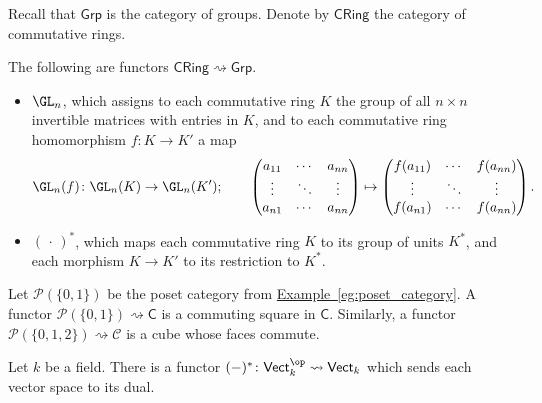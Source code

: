 \documentclass[notes.tex]{subfiles}
\begin{document}
\begin{example}
  \label{eg:twofunctorsgrptocring}
  Recall that $\mathsf{Grp}$ is the category of groups. Denote by $\mathsf{CRing}$ the category of commutative rings.

  The following are functors $\mathsf{CRing} \rightsquigarrow \mathsf{Grp}$.
  \begin{itemize}
    \item $\GL_{n}$, which assigns to each commutative ring $K$ the group of all $n \times n$ invertible matrices with entries in $K$, and to each commutative ring homomorphism $f\colon K \to K'$ a map
      \begin{equation*}
        \GL_{n}(f)\colon \GL_{n}(K) \to \GL_{n}(K');\qquad
        \begin{pmatrix}
          a_{11} & \cdots & a_{nn} \\
          \vdots & \ddots & \vdots \\
          a_{n1} & \cdots & a_{nn}
        \end{pmatrix}
        \mapsto
        \begin{pmatrix}
          f(a_{11}) & \cdots & f(a_{nn}) \\
          \vdots & \ddots & \vdots \\
          f(a_{n1}) & \cdots & f(a_{nn})
        \end{pmatrix}.
      \end{equation*}

    \item ${(\,\cdot\,)}^{*}$, which maps each commutative ring $K$ to its group of units $K^{*}$, and each morphism $K \to K'$ to its restriction to $K^{*}$.
  \end{itemize}
\end{example}

\begin{example}
  Let $\mathcal{P}(\{0, 1\})$ be the poset category from \hyperref[eg:poset_category]{Example~\ref*{eg:poset_category}}. A functor $\mathcal{P}(\{0, 1\}) \rightsquigarrow \mathsf{C}$ is a commuting square in $\mathsf{C}$. Similarly, a functor $\mathcal{P}(\{0, 1, 2\}) \rightsquigarrow \mathcal{C}$ is a cube whose faces commute.
\end{example}

\begin{example}
  Let $k$ be a field. There is a functor $(-)^{*}\colon \mathsf{Vect}_{k}^{\op} \rightsquigarrow \mathsf{Vect}_{k}$ which sends each vector space to its dual.
\end{example}
\end{document}
